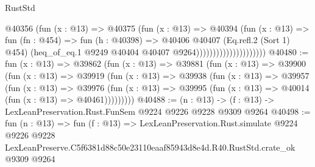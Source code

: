 \begin{lexlean}{RustStd}
\begin{coremodule}
                                    @40356
                                      (fun (x : @13) =>
                                      @40375
                                        (fun (x : @13) =>
                                        @40394
                                          (fun (x : @13) =>
                                          fun (fn : @454) =>
                                          fun (h : @40398) =>
                                          @40406
                                            @40407
                                            (Eq.refl.{2} (Sort 1) @454)
                                            (heq_of_eq.{1}
                                              @9249
                                              @40404
                                              @40407
                                              @9264)))))))))))))))))))))
@40480 := fun (x : @13) =>
  @39862
    (fun (x : @13) =>
    @39881
      (fun (x : @13) =>
      @39900
        (fun (x : @13) =>
        @39919
          (fun (x : @13) =>
          @39938
            (fun (x : @13) =>
            @39957
              (fun (x : @13) =>
              @39976
                (fun (x : @13) => @39995 (fun (x : @13) => @40014 (fun (x : @13) => @40461)))))))))
@40488 := (n : @13) -> (f : @13) -> LexLeanPreservation.Rust.FunSem @9224 @9226 @9228 @9309 @9264
@40498 := fun (n : @13) =>
  fun (f : @13) =>
  LexLeanPreservation.Rust.simulate
    @9224
    @9226
    @9228
    LexLeanPreserve.C5f6381d88c50e23110eaaf85943d8e4d.R40.RustStd.crate_ok
    @9309
    @9264
\end{coremodule}
\end{lexlean}
